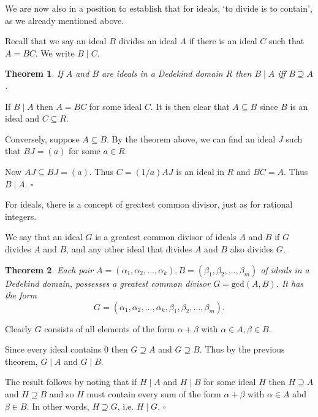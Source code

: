 \documentclass[10pt]{article}
\newcommand{\qed}{\square}
\newtheorem{theorem}{Theorem}[section]
\newenvironment{proof}[1][Proof]{\begin{trivlist}
\item[\hskip \labelsep {\bfseries #1}]}{\end{trivlist}}
\begin{document}
We are now also in a position to establish that for ideals, `to divide is to contain', as we already mentioned above.

Recall that we say an ideal $B$ divides an ideal $A$ if there is an ideal $C$ such that $A = BC$. We write $B \;|\; C$.

\begin{theorem}
If $A$ and $B$ are ideals in a Dedekind domain $R$ then $B \;|\; A$ iff $B \supseteq A$.
\end{theorem}

\begin{proof}
If $B \;|\; A$ then $A = BC$ for some ideal $C$. It is then clear that $A \subseteq B$ since $B$ is an ideal and $C \subseteq R$.

Conversely, suppose $A \subseteq B$. By the theorem above, we can find an ideal $J$ such that $BJ = (a)$ for some $a \in R$.

Now $AJ \subseteq BJ = (a)$. Thus $C = (1/a)AJ$ is an ideal in $R$ and $BC = A$. Thus $B \;|\; A$. $\qed$
\end{proof}

For ideals, there is a concept of greatest common divisor, just as for rational integers.

We say that an ideal $G$ is a greatest common divisor of ideals $A$ and $B$ if $G$ divides $A$ and $B$, and any other ideal that divides $A$ and $B$ also divides $G$.

\begin{theorem}
Each pair $A = (\alpha_1, \alpha_2, \ldots, \alpha_k), B = (\beta_1, \beta_2, \ldots, \beta_m)$ of ideals in a Dedekind domain, possesses a greatest common divisor $G = \mbox{gcd}(A,B)$.
It has the form
$$G = (\alpha_1, \alpha_2, \ldots, \alpha_k, \beta_1, \beta_2, \ldots, \beta_m).$$
\end{theorem}

\begin{proof}
Clearly $G$ consists of all elements of the form $\alpha + \beta$ with $\alpha \in A, \beta \in B$.

Since every ideal contains 0 then $G \supseteq A$ and $G \supseteq B$. Thus by the previous theorem, $G \mid A$ and $G \mid B$.

The result follows by noting that if $H \mid A$ and $H \mid B$ for some ideal $H$ then $H \supseteq A$ and $H \supseteq B$ and so $H$ must contain every sum of the form $\alpha + \beta$ with $\alpha \in A$ abd $\beta \in B$. In other words, $H \supseteq G$, i.e. $H \mid G$. $\qed$
\end{proof}
\end{document}

